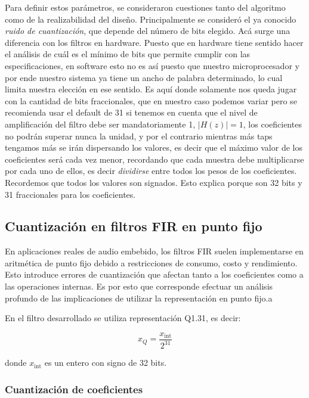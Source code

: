 \documentclass[a4,11pt]{article}
\begin{document}
Para definir estos parámetros, se consideraron cuestiones tanto del algoritmo como de la realizabilidad del diseño. Principalmente se consideró el ya conocido \textit{ruido de cuantización}, que depende del número de bits elegido. Acá surge una diferencia con los filtros en hardware. Puesto que en hardware tiene sentido hacer el análisis de cuál es el mínimo de bits que permite cumplir con las especificaciones, en software esto no es así puesto que nuestro microprocesador y por ende nuestro sistema ya tiene un ancho de palabra determinado, lo cual limita nuestra elección en ese sentido. Es aquí donde solamente nos queda jugar con la cantidad de bits fraccionales, que en nuestro caso podemos variar pero se recomienda usar el default de 31 si tenemos en cuenta que el nivel de amplificación del filtro debe ser mandatoriamente 1, $|H(z)|=1$, los coeficientes no podrán superar nunca la unidad, y por el contrario mientras más taps tengamos más se irán dispersando los valores, es decir que el máximo valor de los coeficientes será cada vez menor, recordando que cada muestra debe multiplicarse por cada uno de ellos, es decir \textit{dividirse} entre todos los pesos de los coeficientes. Recordemos que todos los valores son signados. Esto explica porque son 32 bits y 31 fraccionales para los coeficientes.

\subsection{Cuantización en filtros FIR en punto fijo}
\label{subsec:cuantizacion}

En aplicaciones reales de audio embebido, los filtros FIR suelen implementarse en aritmética de punto fijo debido a restricciones de consumo, costo y rendimiento. Esto introduce errores de cuantización que afectan tanto a los coeficientes como a las operaciones internas. Es por esto que corresponde efectuar un análisis profundo de las implicaciones de utilizar la representación en punto fijo.a

En el filtro desarrollado se utiliza representación Q1.31, es decir:

\begin{equation}
\label{eq:qformat}
x_{Q} = \frac{x_{\text{int}}}{2^{31}}
\end{equation}

donde $x_{\text{int}}$ es un entero con signo de 32 bits.

\subsubsection{Cuantización de coeficientes}
\label{subsubsec:cuantizacion_coeficientes}
\end{document}
